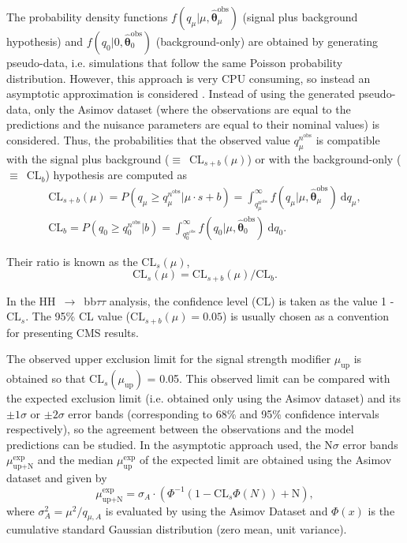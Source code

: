 \documentclass[../main.tex]{subfiles}
\begin{document}
The probability density functions $f(q_\mu|\mu,\boldsymbol{\hat{\theta}}_\mu^\text{obs})$ (signal plus background hypothesis) and $f(q_0|0,\boldsymbol{\hat{\theta}}_0^\text{obs})$ (background-only) are obtained by generating pseudo-data, i.e. simulations that follow the same Poisson probability distribution. However, this approach is very CPU consuming, so instead an asymptotic approximation is considered \cite{hh:results:asymptotic}. Instead of using the generated pseudo-data, only the Asimov dataset (where the observations are equal to the predictions and the nuisance parameters are equal to their nominal values) is considered. Thus, the probabilities that the observed value $q_\mu^{n^{\text{obs}}}$ is compatible with the signal plus background ($\equiv$~CL$_{s+b}(\mu)$) or with the background-only ($\equiv$~CL$_{b}$) hypothesis are computed as
\begin{equation}
\begin{matrix}
\text{CL}_{s+b}(\mu) = P(q_\mu \geq q_\mu^{n^{\text{obs}}} | \mu\cdot s + b) = \int_{q_\mu^{n^{\text{obs}}}}^\infty f(q_\mu|\mu, \boldsymbol{\hat{\theta}}_\mu^\text{obs})~\text{d}q_\mu, \\
\text{CL}_{b} = P(q_0 \geq q_0^{n^{\text{obs}}} | b) = \int_{q_0^{n^{\text{obs}}}}^\infty f(q_0|\mu, \boldsymbol{\hat{\theta}}_0^\text{obs})~\text{d}q_0.
\end{matrix}
\end{equation}

Their ratio is known as the $\text{CL}_{s}(\mu)$,
\begin{equation}
\text{CL}_{s}(\mu) = \text{CL}_{s+b}(\mu) / \text{CL}_{b}.
\end{equation}

In the HH~$\to$~bb$\tau\tau$ analysis, the confidence level (CL) is taken as the value 1 - $\text{CL}_{s}$. The 95\% CL value ($\text{CL}_{s+b}(\mu) = 0.05$) is usually chosen as a convention for presenting CMS results.

The observed upper exclusion limit for the signal strength modifier $\mu_{\text{up}}$ is obtained so that $\text{CL}_{s}(\mu_{\text{up}})$ = 0.05. This observed limit can be compared with the expected exclusion limit (i.e. obtained only using the Asimov dataset) and its $\pm1\sigma$ or $\pm2\sigma$ error bands (corresponding to 68\% and 95\% confidence intervals respectively), so the agreement between the observations and the model predictions can be studied. In the asymptotic approach used, the N$\sigma$ error bands $\mu_{\text{up+N}}^\text{exp}$ and the median $\mu_{\text{up}}^\text{exp}$ of the expected limit are obtained using the Asimov dataset and given by \cite{hh:results:asymptotic}
\begin{equation}
\mu_{\text{up+N}}^\text{exp} = \sigma_A\cdot\left(\Phi^{-1}(1 - \text{CL}_s\Phi(N)) + \text{N}  \right),
\end{equation}
where $\sigma^2_A=\mu^2/q_{\mu, A}$ is evaluated by using the Asimov Dataset and $\Phi(x)$ is the cumulative standard Gaussian distribution (zero mean, unit variance).
\end{document}
